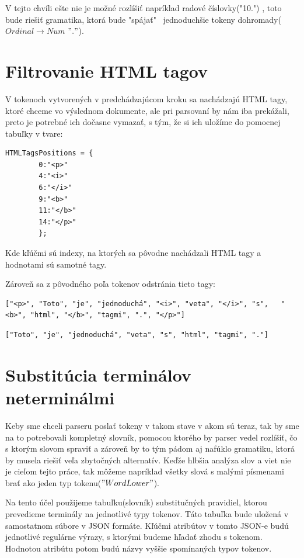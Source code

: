 \documentclass[12pt,a4paper]{report}
\theoremstyle{definition}
\theoremstyle{remark}
\begin{document}
V tejto chvíli ešte nie je možné rozlíšiť napríklad radové číslovky("10.") , toto bude riešiť gramatika, ktorá bude "spájať" \ jednoduchšie tokeny dohromady($Ordinal \to Num $ $"."$).

\section{Filtrovanie HTML tagov}
V tokenoch vytvorených v predchádzajúcom kroku sa nachádzajú HTML tagy, ktoré chceme vo výslednom dokumente, ale pri parsovaní by nám iba prekážali, preto je potrebné ich dočasne vymazať, s tým, že si ich uložíme do pomocnej tabuľky v tvare:\\
\begin{lstlisting}[caption={Tabuľka HTML tagov}, style=htmlcssjs]
HTMLTagsPositions = {
		0:"<p>"
		4:"<i>"
		6:"</i>"
		9:"<b>"
		11:"</b>"
		14:"</p>"
		};
\end{lstlisting}

\noindent Kde kľúčmi sú indexy, na ktorých sa pôvodne nachádzali HTML tagy a hodnotami sú samotné tagy.

Zároveň sa z pôvodného poľa tokenov odstránia tieto tagy:
\begin{lstlisting}[caption={Text pred odstránením tagov}, style=htmlcssjs]
["<p>", "Toto", "je", "jednoduchá", "<i>", "veta", "</i>", "s",   "<b>", "html", "</b>", "tagmi", ".", "</p>"]
\end{lstlisting}
\begin{lstlisting}[caption={Text po odstránení tagov}, style=htmlcssjs]
["Toto", "je", "jednoduchá", "veta", "s", "html", "tagmi", "."]
\end{lstlisting}

\section{Substitúcia terminálov neterminálmi}
Keby sme chceli parseru poslať tokeny v takom stave v akom sú teraz, tak by sme na to potrebovali kompletný slovník, pomocou ktorého by parser vedel rozlíšiť, čo s ktorým slovom spraviť a zároveň by to tým pádom aj nafúklo gramatiku, ktorá by musela riešiť veľa zbytočných alternatív. Keďže hlbšia analýza slov a viet nie je cieľom tejto práce, tak  môžeme napríklad všetky slová s malými písmenami brať ako jeden typ tokenu($"WordLower"$).

Na tento účel použijeme tabuľku(slovník) substitučných pravidiel, ktorou prevedieme terminály na jednotlivé typy tokenov. Táto tabuľka bude uložená v samostatnom súbore v JSON formáte. Kľúčmi atribútov v tomto JSON-e budú jednotlivé regulárne výrazy, s ktorými budeme hľadať zhodu s tokenom. Hodnotou atribútu potom budú názvy vyššie spomínaných typov tokenov.
\end{document}
